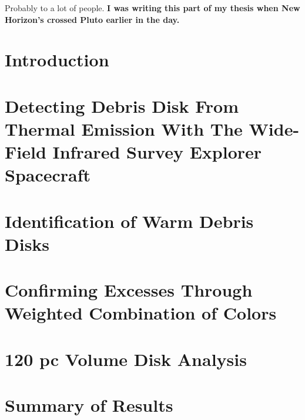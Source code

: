 \documentclass[phd,bottom,nosig]{usbthesis}
\begin{document}
\begin{dedication}
   Probably to a lot of people. \textbf{I was writing this part of my thesis when New Horizon's crossed Pluto earlier in the day.}
\end{dedication}

\tableofcontents %
\listoffigures %
\listoftables %

\begin{acknowledgements}

\end{acknowledgements}

\pagestyle{thesis}



\newpage
{}

\chapter{Introduction} \label{chap:intro}


\chapter{Detecting Debris Disk From Thermal Emission With The Wide-Field Infrared Survey Explorer Spacecraft}\label{chap:wise_method}


\chapter{Identification of Warm Debris Disks} \label{chap:iddisks}
%
\clearpage
%


\chapter{Confirming Excesses Through Weighted Combination of Colors}\label{chap:confirm}

\chapter{120 pc Volume Disk Analysis}\label{chap:120pc}

\chapter{Summary of Results}\label{chap:summary}
\end{document}

